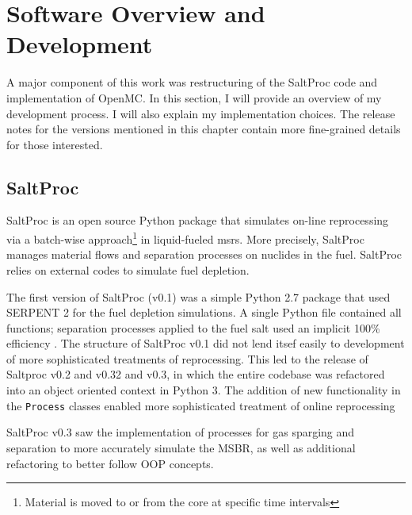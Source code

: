 \chapter{Software Overview and Development}%
\label{cha:software_development}

A major component of this work was restructuring of the SaltProc code and implementation of OpenMC. In this section, I will provide an overview of my development process. I will also explain my implementation choices. The release notes for the versions mentioned in this chapter contain more fine-grained details for those interested.

\section{SaltProc}%
\label{sec:saltproc}

SaltProc\cite{rykhlevskii_saltproc_2018} is an open source Python package that simulates on-line reprocessing via a batch-wise approach\footnote{Material is moved to or from the core at specific time intervals} in liquid-fueled \Gls{msr}s. More precisely, SaltProc manages material flows and separation processes on nuclides in the fuel. SaltProc relies on external codes to simulate fuel depletion.

The first version of SaltProc (v0.1) was a simple Python 2.7 package that used SERPENT 2 for the fuel depletion simulations. A single Python file contained all functions; separation processes applied to the fuel salt used an implicit 100\% efficiency \cite{rykhlevskii_advanced_2018}. The structure of SaltProc v0.1 did not lend itsef easily to development of more sophisticated treatments of reprocessing. This led to the release of Saltproc v0.2 and v0.32 and v0.3, in which the entire codebase was refactored into an object oriented
context in Python 3. The addition of new functionality in the \verb.Process. classes enabled more sophisticated treatment of online reprocessing \cite{rykhlevskii_fuel_2020} 

SaltProc v0.3 saw the implementation of processes for gas sparging and separation to more accurately simulate the MSBR, as well as additional refactoring to better follow OOP concepts.

